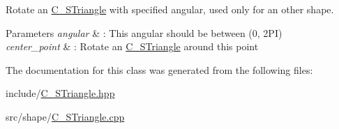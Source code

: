 Rotate an \hyperlink{classC__STriangle}{C\+\_\+\+S\+Triangle} with specified angular, used only for an other shape. 


\begin{DoxyParams}{Parameters}
{\em angular} & \+: This angular should be between (0, 2\+PI) \\
\hline
{\em center\+\_\+point} & \+: Rotate an \hyperlink{classC__STriangle}{C\+\_\+\+S\+Triangle} around this point \\
\hline
\end{DoxyParams}


The documentation for this class was generated from the following files\+:\begin{DoxyCompactItemize}
\item 
include/\hyperlink{C__STriangle_8hpp}{C\+\_\+\+S\+Triangle.\+hpp}\item 
src/shape/\hyperlink{C__STriangle_8cpp}{C\+\_\+\+S\+Triangle.\+cpp}\end{DoxyCompactItemize}
